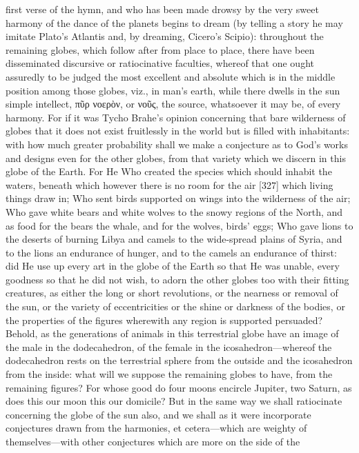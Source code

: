 \documentclass{article}
\begin{document}
first verse of the hymn, and who has been made drowsy by the very sweet
harmony of the dance of the planets begins to dream (by telling a story
he may imitate Plato's Atlantis and, by dreaming, Cicero's Scipio):
throughout the remaining globes, which follow after from place to place,
there have been disseminated discursive or ratiocinative faculties,
whereof that one ought assuredly to be judged the most excellent and
absolute which is in the middle position among those globes, viz., in
man's earth, while there dwells in the sun simple intellect, πῦρ νοερὸν, or
νοῦς, the source, whatsoever it may be, of every harmony.
For if it was Tycho Brahe's opinion concerning that bare wilderness of
globes that it does not exist fruitlessly in the world but is filled with
inhabitants: with how much greater probability shall we make a
conjecture as to God's works and designs even for the other globes, from
that variety which we discern in this globe of the Earth. For He Who
created the species which should inhabit the waters, beneath which
however there is no room for the air [327] which living things draw in;
Who sent birds supported on wings into the wilderness of the air; Who
gave white bears and white wolves to the snowy regions of the North,
and as food for the bears the whale, and for the wolves, birds' eggs; Who
gave lions to the deserts of burning Libya and camels to the wide-spread
plains of Syria, and to the lions an endurance of hunger, and to the
camels an endurance of thirst: did He use up every art in the globe of the
Earth so that He was unable, every goodness so that he did not wish, to
adorn the other globes too with their fitting creatures, as either the long
or short revolutions, or the nearness or removal of the sun, or the variety
of eccentricities or the shine or darkness of the bodies, or the properties
of the figures wherewith any region is supported persuaded?
Behold, as the generations of animals in this terrestrial globe have an
image of the male in the dodecahedron, of the female in the
icosahedron—whereof the dodecahedron rests on the terrestrial sphere
from the outside and the icosahedron from the inside: what will we
suppose the remaining globes to have, from the remaining figures? For
whose good do four moons encircle Jupiter, two Saturn, as does this our
moon this our domicile? But in the same way we shall ratiocinate
concerning the globe of the sun also, and we shall as it were incorporate
conjectures drawn from the harmonies, et cetera—which are weighty of
themselves—with other conjectures which are more on the side of the
\end{document}
